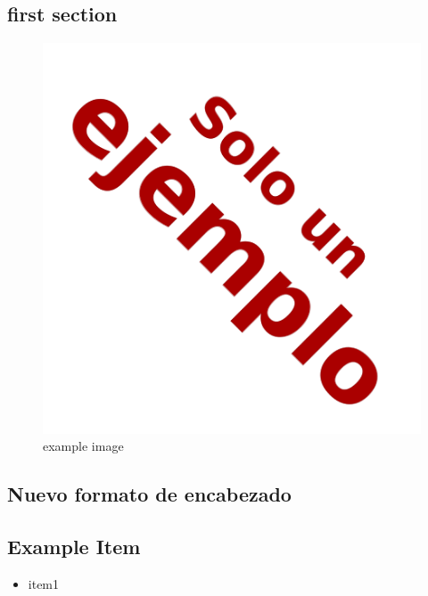 \documentclass[letterpaper,11pt]{article}
\begin{document}
\begin{multicols*}{2} %

\section{first section}

\begin{figure}[H]
\begin{center}
\includegraphics[scale=0.5]{figures/ejemplo_img.png}
\caption{example image} 
\end{center}
\end{figure}

\subsection*{Nuevo formato de encabezado}



\subsection*{Example Item}

\begin{itemize}
\item item1


\end{itemize}
\end{multicols*}
\end{document}
